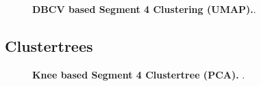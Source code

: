 \begin{figure}[!hbt]
\begin{subfigure}[b]{0.475\textwidth}
    \end{subfigure}
    \caption[\Acrshort{DBCV} based Segment 4 Clustering (\Acrshort{UMAP})]{\textbf{\Acrshort{DBCV} based Segment 4 Clustering (\Acrshort{UMAP}).}.}
    \label{fig:UMAP_Cluster_DBCV_4}
\end{figure}




\subsection{Clustertrees}

\begin{figure}[!hbt]
    \centering

    \caption[Knee based Segment 4 Clustertree (\Acrshort{PCA})]{\textbf{Knee based Segment 4 Clustertree (\Acrshort{PCA}).} .}
    \label{fig:PCA_Clusteree_Knee_4}
\end{figure}


